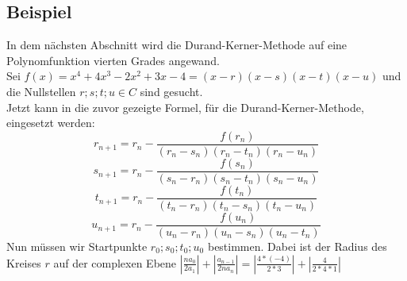 \documentclass[12pt]{article}
\begin{document}
    \subsection{Beispiel}
        In dem nächsten Abschnitt wird die Durand-Kerner-Methode auf eine Polynomfunktion vierten Grades angewand. \\
        Sei $f(x) = x^4 + 4x^3 - 2x^2 + 3x - 4 = (x-r)(x-s)(x-t)(x-u)$ und die Nullstellen $r;s;t;u \in C$ sind gesucht. \\
        Jetzt kann in die zuvor gezeigte Formel, für die Durand-Kerner-Methode, eingesetzt werden:
        \begin{displaymath}
            r_{n+1} = r_n-\frac{f(r_n)}{(r_n-s_n)(r_n-t_n)(r_n-u_n)}
        \end{displaymath}
        \begin{displaymath}
            s_{n+1} = r_n-\frac{f(s_n)}{(s_n-r_n)(s_n-t_n)(s_n-u_n)}
        \end{displaymath}
        \begin{displaymath}
            t_{n+1} = r_n-\frac{f(t_n)}{(t_n-r_n)(t_n-s_n)(t_n-u_n)}
        \end{displaymath}
        \begin{displaymath}
            u_{n+1} = r_n-\frac{f(u_n)}{(u_n-r_n)(u_n-s_n)(u_n-t_n)}
        \end{displaymath}
        \vspace{0.2cm}
        Nun müssen wir Startpunkte $r_0;s_0;t_0;u_0$ bestimmen. Dabei ist der Radius des Kreises $r$ auf der complexen Ebene $|\frac{na_0}{2a_1}| + |\frac{a_{n-1}}{2na_n}| = |\frac{4 * (-4)}{2 * 3}| + |\frac{4}{2 * 4 * 1}|$
\end{document}
